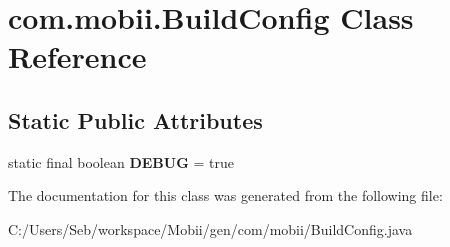 \hypertarget{classcom_1_1mobii_1_1_build_config}{\section{com.\-mobii.\-Build\-Config Class Reference}
\label{classcom_1_1mobii_1_1_build_config}
}
\subsection*{Static Public Attributes}
\begin{DoxyCompactItemize}
\item 
\hypertarget{classcom_1_1mobii_1_1_build_config_af00ced5769dd93fd5ba1cede20cb1127}{static final boolean {\bfseries D\-E\-B\-U\-G} = true}\label{classcom_1_1mobii_1_1_build_config_af00ced5769dd93fd5ba1cede20cb1127}

\end{DoxyCompactItemize}


The documentation for this class was generated from the following file\-:\begin{DoxyCompactItemize}
\item 
C\-:/\-Users/\-Seb/workspace/\-Mobii/gen/com/mobii/Build\-Config.\-java\end{DoxyCompactItemize}
